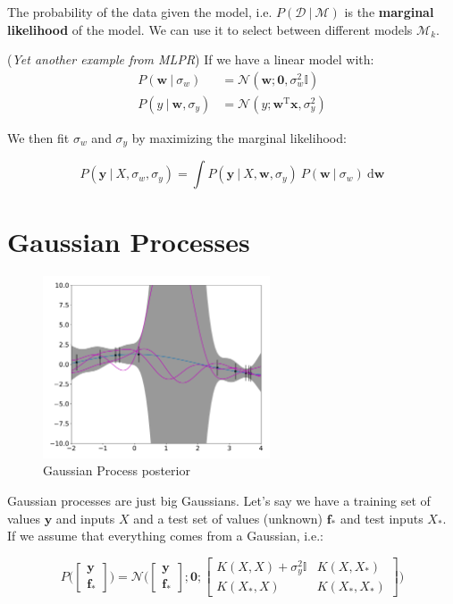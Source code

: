\documentclass{article}
\newcommand{\vf}[1]{\mathbf{#1}}
\newcommand{\normal}{\mathcal{N}}
\newcommand{\bx}{\vf{x}}
\newcommand{\by}{\vf{y}}
\newcommand{\bw}{\vf{w}}
\newcommand{\bfu}{\vf{f}}
\newcommand{\giv}{\ |\ }
\newcommand{\data}{\mathcal{D}}
\newcommand{\model}{\mathcal{M}}
\newcommand{\de}{\text{d}}
\newcommand{\tran}{\text{T}}
\begin{document}
The probability of the data given the model, i.e. $P(\data \giv \model)$ is the \textbf{marginal likelihood} of the model. We can use it to select between different models $\model_k$.
\vskip 0.1in

(\textit{Yet another example from MLPR}) If we have a linear model with:
\begin{align*}
    P(\bw \giv \sigma_w) &= \normal(\bw; \mathbf{0}, \sigma_w^2 \mathbb{I}) \\
    P(y \giv \bw, \sigma_y) &= \normal(y; \bw^\tran \bx, \sigma_y^2)
\end{align*}

We then fit $\sigma_w$ and $\sigma_y$ by maximizing the marginal likelihood:

\begin{equation*}
    P(\by \giv X, \sigma_w, \sigma_y) =
        \int P(\by \giv X, \bw, \sigma_y)\ P(\bw \giv \sigma_w)\ \de\bw
\end{equation*}

\section{Gaussian Processes}
\begin{figure}
    \centering
    \includegraphics[width=0.6\textwidth]{figures/gp}
    \caption{Gaussian Process posterior}
    \label{fig:gp}
\end{figure}

Gaussian processes are just big Gaussians. Let's say we have a training set of values $\by$ and inputs $X$ and a test set of values (unknown) $\bfu_*$ and test inputs $X_*$. If we assume that everything comes from a Gaussian, i.e.:

\begin{equation*}
    P\bigg(\begin{bmatrix}
        \by \\
        \bfu_*
    \end{bmatrix}\bigg) = \normal\bigg(
        \begin{bmatrix}
            \by \\
            \bfu_*
        \end{bmatrix};
        \mathbf{0};
        \begin{bmatrix}
            K(X, X) + \sigma_y^2 \mathbb{I} & K(X, X_*) \\
            K(X_*, X) & K(X_*, X_*)
        \end{bmatrix}
    \bigg)
\end{equation*}
\end{document}
